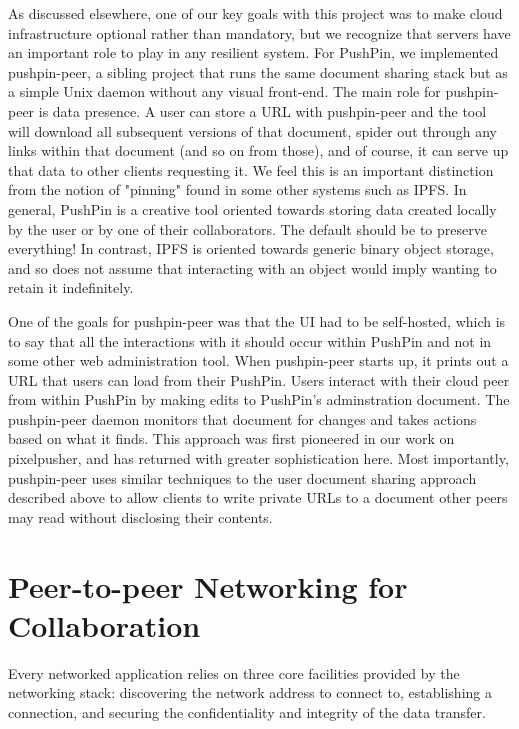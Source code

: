 \documentclass[sigplan,10pt]{acmart}
\begin{document}
As discussed elsewhere, one of our key goals with this project was to make cloud infrastructure optional rather than mandatory, but we recognize that servers have an important role to play in any resilient system. For PushPin, we implemented pushpin-peer, a sibling project that runs the same document sharing stack but as a simple Unix daemon without any visual front-end. The main role for pushpin-peer is data presence. A user can store a URL with pushpin-peer and the tool will download all subsequent versions of that document, spider out through any links within that document (and so on from those), and of course, it can serve up that data to other clients requesting it. We feel this is an important distinction from the notion of "pinning" found in some other systems such as IPFS. In general, PushPin is a creative tool oriented towards storing data created locally by the user or by one of their collaborators. The default should be to preserve everything! In contrast, IPFS is oriented towards generic binary object storage, and so does not assume that interacting with an object would imply wanting to retain it indefinitely.

One of the goals for pushpin-peer was that the UI had to be self-hosted, which is to say that all the interactions with it should occur within PushPin and not in some other web administration tool. When pushpin-peer starts up, it prints out a URL that users can load from their PushPin. Users interact with their cloud peer from within PushPin by making edits to PushPin's adminstration document. The pushpin-peer daemon monitors that document for changes and takes actions based on what it finds. This approach was first pioneered in our work on pixelpusher, and has returned with greater sophistication here. Most importantly, pushpin-peer uses similar techniques to the user document sharing approach described above to allow clients to write private URLs to a document other peers may read without disclosing their contents.

\section{Peer-to-peer Networking for Collaboration}\label{sec:networking}

Every networked application relies on three core facilities provided by the networking stack: discovering the network address to connect to, establishing a connection, and securing the confidentiality and integrity of the data transfer.
\end{document}
